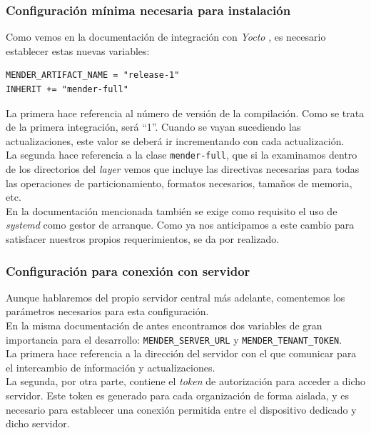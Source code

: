 \subsubsection{Configuración mínima necesaria para instalación}

Como vemos en la documentación de integración con \textit{Yocto} \cite{building-mender-artifacts}, es necesario establecer estas nuevas variables:

\begin{lstlisting}
MENDER_ARTIFACT_NAME = "release-1"
INHERIT += "mender-full"
\end{lstlisting} 

La primera hace referencia al número de versión de la compilación. Como se trata de la primera integración, será ``1''. Cuando se vayan sucediendo las actualizaciones, este valor se deberá ir incrementando con cada actualización.\\

La segunda hace referencia a la clase \texttt{mender-full}, que si la examinamos dentro de los directorios del \textit{layer} vemos que incluye las directivas necesarias para todas las operaciones de particionamiento, formatos necesarios, tamaños de memoria, etc.\\

En la documentación mencionada también se exige como requisito el uso de \textit{systemd} como gestor de arranque. Como ya nos anticipamos a este cambio para satisfacer nuestros propios requerimientos, se da por realizado.\\

\subsubsection{Configuración para conexión con servidor}

Aunque hablaremos del propio servidor central más adelante, comentemos los parámetros necesarios para esta configuración.\\

En la misma documentación de antes encontramos dos variables de gran importancia para el desarrollo: \texttt{MENDER\_SERVER\_URL} y \texttt{MENDER\_TENANT\_TOKEN}.\\

La primera hace referencia a la dirección del servidor con el que comunicar para el intercambio de información y actualizaciones.\\

La segunda, por otra parte, contiene el \textit{token} de autorización para acceder a dicho servidor. Este token es generado para cada organización de forma aislada, y es necesario para establecer una conexión permitida entre el dispositivo dedicado y dicho servidor.\\

